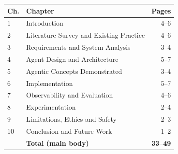 \documentclass[12pt,a4paper,oneside]{report}
\begin{document}
\begin{tcolorbox}[colback=white,colframe=gray!60,arc=2pt,boxrule=0.5pt,title=\textbf{Suggested page budget},colbacktitle=gray!20,coltitle=black]
\small
\begin{tabularx}{\linewidth}{@{}l X r@{}}
\toprule
\textbf{Ch.} & \textbf{Chapter} & \textbf{Pages} \\ \midrule
1 & Introduction & 4--6 \\
2 & Literature Survey and Existing Practice & 4--6 \\
3 & Requirements and System Analysis & 3--4 \\
4 & Agent Design and Architecture & 5--7 \\
5 & Agentic Concepts Demonstrated & 3--4 \\
6 & Implementation & 5--7 \\
7 & Observability and Evaluation & 4--6 \\
8 & Experimentation & 2--4 \\
9 & Limitations, Ethics and Safety & 2--3 \\
10 & Conclusion and Future Work & 1--2 \\ \midrule
 & \textbf{Total (main body)} & \textbf{33--49} \\ \bottomrule
\end{tabularx}
\end{tcolorbox}
\clearpage
\fi
\end{document}
